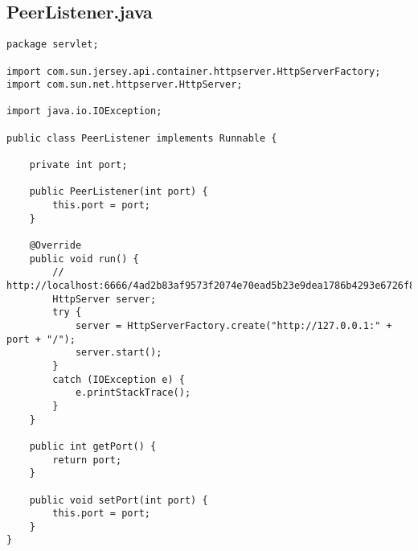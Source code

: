 \documentclass{acm_proc_article-sp}
\begin{document}
\subsection{PeerListener.java}
\begin{lstlisting}
package servlet;

import com.sun.jersey.api.container.httpserver.HttpServerFactory;
import com.sun.net.httpserver.HttpServer;

import java.io.IOException;

public class PeerListener implements Runnable {

    private int port;

    public PeerListener(int port) {
        this.port = port;
    }

    @Override
    public void run() {
        // http://localhost:6666/4ad2b83af9573f2074e70ead5b23e9dea1786b4293e6726f88b8e34f1b4a8942
        HttpServer server;
        try {
            server = HttpServerFactory.create("http://127.0.0.1:" + port + "/");
            server.start();
        }
        catch (IOException e) {
            e.printStackTrace();
        }
    }

    public int getPort() {
        return port;
    }

    public void setPort(int port) {
        this.port = port;
    }
}
\end{lstlisting}
\end{document}
